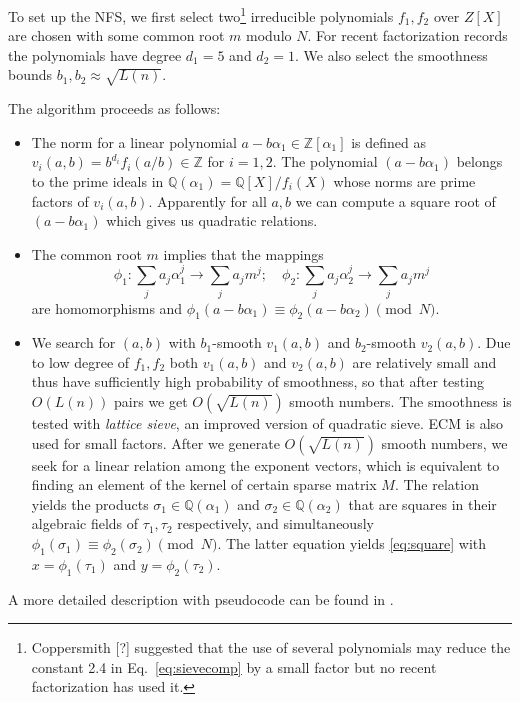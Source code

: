 \documentclass[a4paper]{article}
\begin{document}
To set up the NFS, we first select two\footnote{Coppersmith [?] suggested that the use of several polynomials may reduce the constant 2.4 in Eq.~\eqref{eq:sievecomp} by a small factor but no recent factorization has used it.} irreducible polynomials $f_1,f_2$ over $Z[X]$ are chosen with some common root $m$ modulo $N$. For recent factorization records  the polynomials have degree $d_1=5$ and $d_2=1$. We also select the smoothness bounds $b_1,b_2\approx \sqrt{L(n)}$.

The algorithm proceeds as follows:
\begin{itemize}
    \item The norm for a linear polynomial $a-b\alpha_1\in \mathbb{Z}[\alpha_1]$ is defined as $v_i(a,b) =  b^{d_i}f_i(a/b)\in \mathbb{Z}$ for $i=1,2$. The polynomial $(a-b\alpha_1)$ belongs to the prime ideals in $\mathbb{Q}(\alpha_1)=\mathbb{Q}[X]/f_i(X)$ whose norms are prime factors of $v_i(a,b)$.  Apparently  for all $a,b$ we can compute a square root of $(a-b\alpha_1)$ which gives us quadratic relations.
    \item The common root $m$ implies that the mappings $$
    \phi_1:\sum_j a_j \alpha_1^j\rightarrow\sum_j a_j m^j;\quad \phi_2:\sum_j a_j \alpha_2^j\rightarrow\sum_j a_j m^j
    $$
    are homomorphisms and $\phi_1(a-b\alpha_1) \equiv \phi_2(a-b\alpha_2) \pmod{N}$. 
    \item We search for $(a,b)$ with $b_1$-smooth $v_1(a,b)$ and $b_2$-smooth $v_2(a,b)$. Due to low degree of $f_1,f_2$ both $v_1(a,b)$ and $v_2(a,b)$ are relatively small and thus have sufficiently high probability of smoothness, so that after testing $O(L(n))$ pairs we get $O(\sqrt{L(n)})$ smooth numbers.  The smoothness is tested with \emph{lattice sieve}, an improved version of quadratic sieve. ECM is also used for small factors.  After we generate $O(\sqrt{L(n)})$ smooth numbers, we seek for a linear relation among the exponent vectors, which is equivalent to finding an element of the kernel of certain sparse matrix $M$.  The relation yields the products $\sigma_1\in\mathbb{Q}(\alpha_1) $ and $\sigma_2\in\mathbb{Q}(\alpha_2)$ that are squares in their algebraic fields of $\tau_1,\tau_2$ respectively, and simultaneously $\phi_1(\sigma_1) \equiv \phi_2(\sigma_2)\pmod{N}$. The latter equation yields \eqref{eq:square} with $x=\phi_1(\tau_1)$ and $y=\phi_2(\tau_2)$.
\end{itemize}
A more detailed 
description with pseudocode can be found in \cite{winograd2012number}.
\end{document}
